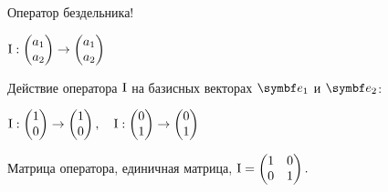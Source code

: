 \begin{frame}{Оператор бездельника!}


$\mathrm{I} : \begin{pmatrix}
  a_1 \\
  a_2 \\
\end{pmatrix} \to 
\begin{pmatrix}
  a_1 \\
  a_2 \\
\end{pmatrix}$

\pause

Действие оператора $\mathrm{I}$ на базисных векторах $\be_1$ и $\be_2$:

$\mathrm{I} : \begin{pmatrix}
  1 \\
  0 \\
\end{pmatrix} \to 
\begin{pmatrix}
1  \\
0  \\
\end{pmatrix}, \quad
\mathrm{I} : \begin{pmatrix}
  0 \\
  1 \\
\end{pmatrix} \to 
\begin{pmatrix}
0 \\
1 \\
\end{pmatrix}$

\pause

Матрица оператора, \alert{единичная матрица}, $\mathrm{I} = 
\begin{pmatrix}
  1 & 0  \\
  0 & 1 \\
\end{pmatrix}.$



\end{frame}
    



